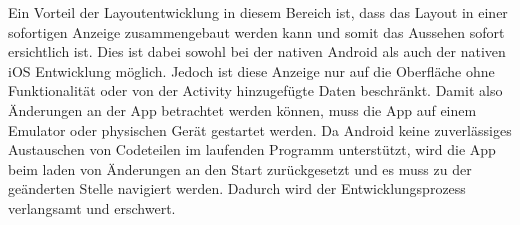 Ein Vorteil der Layoutentwicklung in diesem Bereich ist, dass das Layout in einer sofortigen Anzeige zusammengebaut werden kann und somit das Aussehen sofort ersichtlich ist. Dies ist dabei sowohl bei der nativen Android als auch der nativen iOS Entwicklung möglich. 
Jedoch ist diese Anzeige nur auf die Oberfläche ohne Funktionalität oder von der Activity hinzugefügte Daten beschränkt. 
Damit also Änderungen an der App betrachtet werden können, muss die App auf einem Emulator oder physischen Gerät gestartet werden.
Da Android keine zuverlässiges Austauschen von Codeteilen im laufenden Programm unterstützt, wird die App beim laden von Änderungen an den Start zurückgesetzt und es muss zu der geänderten Stelle navigiert werden. 
Dadurch wird der Entwicklungsprozess verlangsamt und erschwert.
